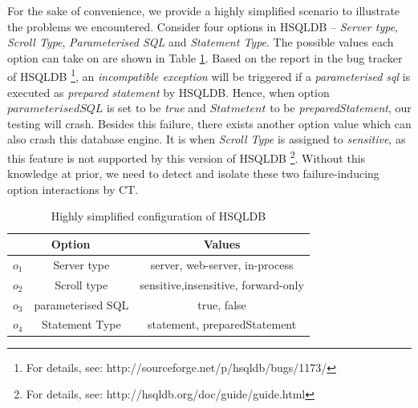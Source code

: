\documentclass[10pt,journal,compsoc]{IEEEtran}
\begin{document}
For the sake of convenience, we provide a highly simplified scenario to illustrate the problems we encountered. Consider four options in HSQLDB -- \emph{Server type}, \emph{Scroll Type}, \emph{Parameterised SQL} and \emph{Statement Type}.  The possible values each option can take on are shown in Table \ref{tomcat-simplifiy}. Based on the report in the bug tracker of HSQLDB \footnote{For details, see: http://sourceforge.net/p/hsqldb/bugs/1173/}, an \emph{incompatible exception} will be triggered if a \emph{parameterised sql} is executed as \emph{prepared statement} by HSQLDB. Hence, when option $ parameterised SQL$ is set to be \emph{true} and $Statmetent$ to be \emph{preparedStatement}, our testing will crash. Besides this failure, there exists another option value which can also crash this database engine. It is when \emph{Scroll Type} is assigned to \emph{sensitive}, as this feature is not supported by this version of HSQLDB \footnote{For details, see: http://hsqldb.org/doc/guide/guide.html}. Without this knowledge at prior, we need to detect and isolate these two failure-inducing option interactions by CT.

%


\begin{table}[h]
\caption{Highly simplified configuration of HSQLDB}
\label{tomcat-simplifiy}
\centering
\begin{tabular}{cc|ccccc}
 \hline
 \multicolumn{2}{c}{\bfseries Option} & \multicolumn{5}{c}{\bfseries Values} \\  \hline
$o_{1}$ & Server type & \multicolumn{5}{c}{ server, web-server, in-process} \\
$o_{2}$ & Scroll type & \multicolumn{5}{c}{ sensitive,insensitive, forward-only} \\
$o_{3}$ & parameterised SQL & \multicolumn{5}{c}{true, false} \\
$o_{4}$ & Statement Type & \multicolumn{5}{c}{ statement, preparedStatement} \\
 \hline
\end{tabular}
\end{table}
\end{document}
